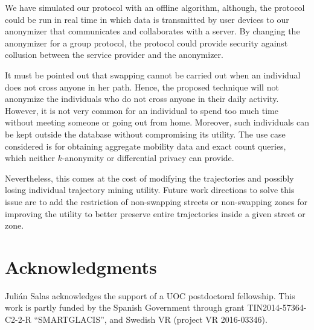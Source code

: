 \documentclass{llncs}
\begin{document}
We have simulated our protocol with an offline algorithm, although, the protocol could be run in real time in which data is transmitted by user devices to our anonymizer that communicates and collaborates with a server. By changing the anonymizer for a group protocol, the protocol could provide security against collusion between the service provider and the anonymizer.
%
%

It must be pointed out that swapping cannot be carried out when an individual does not cross anyone in her path. Hence, the proposed technique will not anonymize the individuals who do not cross anyone in their daily activity.
However, it is not very common for an individual to spend too much time without meeting someone or going out from home. Moreover, such individuals can be kept outside the database without compromising its utility.
The use case considered is for obtaining aggregate mobility data and exact count queries, which neither $k$-anonymity or differential privacy can provide.

Nevertheless, this comes at the cost of modifying the trajectories and possibly losing individual trajectory mining utility.
Future work directions to solve this issue are to add the restriction of non-swapping streets or non-swapping zones for improving the utility to better preserve entire trajectories inside a given street or zone.

\section*{Acknowledgments}
Juli\'{a}n Salas acknowledges the support of a UOC postdoctoral fellowship.
This work is partly funded by the Spanish Government through grant TIN2014-57364-C2-2-R ``SMARTGLACIS'', and Swedish VR (project VR 2016-03346).



\end{document}

